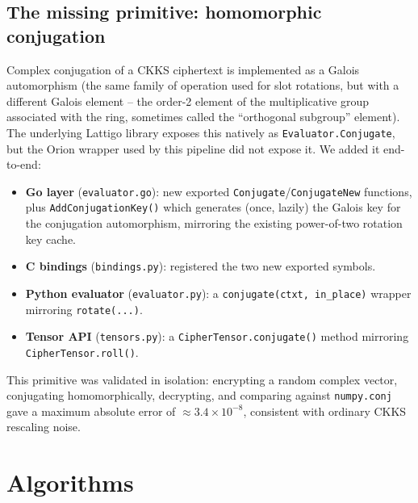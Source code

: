 \documentclass[11pt]{article}
\begin{document}
\subsection{The missing primitive: homomorphic conjugation}
Complex conjugation of a CKKS ciphertext is implemented as a Galois
automorphism (the same family of operation used for slot rotations, but
with a different Galois element -- the order-2 element of the
multiplicative group associated with the ring, sometimes called the
``orthogonal subgroup'' element). The underlying Lattigo library exposes
this natively as \texttt{Evaluator.Conjugate}, but the Orion wrapper used by
this pipeline did not expose it. We added it end-to-end:
\begin{itemize}
  \item \textbf{Go layer} (\texttt{evaluator.go}): new exported
        \texttt{Conjugate}/\texttt{ConjugateNew} functions, plus
        \texttt{AddConjugationKey()} which generates (once, lazily) the
        Galois key for the conjugation automorphism, mirroring the existing
        power-of-two rotation key cache.
  \item \textbf{C bindings} (\texttt{bindings.py}): registered the two new
        exported symbols.
  \item \textbf{Python evaluator} (\texttt{evaluator.py}): a
        \texttt{conjugate(ctxt, in\_place)} wrapper mirroring
        \texttt{rotate(...)}.
  \item \textbf{Tensor API} (\texttt{tensors.py}): a
        \texttt{CipherTensor.conjugate()} method mirroring
        \texttt{CipherTensor.roll()}.
\end{itemize}
This primitive was validated in isolation: encrypting a random complex
vector, conjugating homomorphically, decrypting, and comparing against
\texttt{numpy.conj} gave a maximum absolute error of $\approx 3.4\times
10^{-8}$, consistent with ordinary CKKS rescaling noise.

\section{Algorithms}
\end{document}
